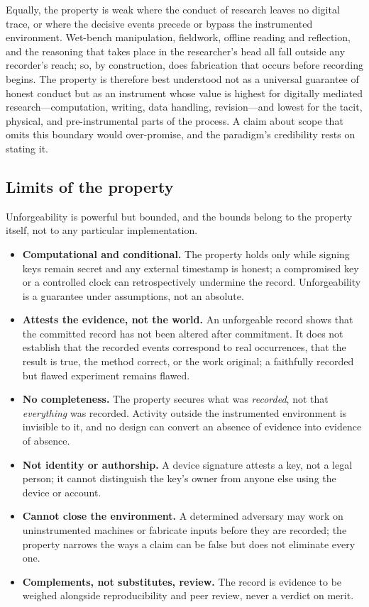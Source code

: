 \documentclass[11pt]{article}
\begin{document}
Equally, the property is weak where the conduct of research leaves no digital trace, or
where the decisive events precede or bypass the instrumented environment. Wet-bench
manipulation, fieldwork, offline reading and reflection, and the reasoning that takes
place in the researcher's head all fall outside any recorder's reach; so, by
construction, does fabrication that occurs before recording begins. The property is
therefore best understood not as a universal guarantee of honest conduct but as an
instrument whose value is highest for digitally mediated research---computation, writing,
data handling, revision---and lowest for the tacit, physical, and pre-instrumental parts
of the process. A claim about scope that omits this boundary would over-promise, and the
paradigm's credibility rests on stating it.

\subsection{Limits of the property}

Unforgeability is powerful but bounded, and the bounds belong to the property itself,
not to any particular implementation.

\begin{itemize}
  \item \textbf{Computational and conditional.} The property holds only while signing
        keys remain secret and any external timestamp is honest; a compromised key or a
        controlled clock can retrospectively undermine the record. Unforgeability is a
        guarantee under assumptions, not an absolute.
  \item \textbf{Attests the evidence, not the world.} An unforgeable record shows that
        the committed record has not been altered after commitment. It does not
        establish that the recorded events correspond to real occurrences, that the
        result is true, the method correct, or the work original; a faithfully recorded
        but flawed experiment remains flawed.
  \item \textbf{No completeness.} The property secures what was \emph{recorded}, not
        that \emph{everything} was recorded. Activity outside the instrumented
        environment is invisible to it, and no design can convert an absence of evidence
        into evidence of absence.
  \item \textbf{Not identity or authorship.} A device signature attests a key, not a
        legal person; it cannot distinguish the key's owner from anyone else using the
        device or account.
  \item \textbf{Cannot close the environment.} A determined adversary may work on
        uninstrumented machines or fabricate inputs before they are recorded; the
        property narrows the ways a claim can be false but does not eliminate every one.
  \item \textbf{Complements, not substitutes, review.} The record is evidence to be
        weighed alongside reproducibility and peer review, never a verdict on merit.
\end{itemize}
\end{document}
